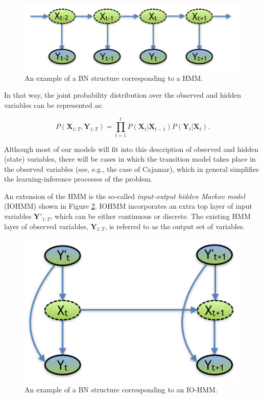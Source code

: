 \begin{figure}[ht!]
\begin{center}
\includegraphics[scale=0.4]{./figures/PreliminariesHMM}
\caption{\label{Figure:HMM}An example of a BN structure corresponding to a HMM.}
\end{center}
\end{figure}

In that way, the joint probability distribution over the observed and hidden variables can be represented as:

\begin{equation}
P(\bm X_{1:T},\bm Y_{1:T}) = \prod_{t=1}^t{P(\bm X_t| \bm X_{t-1})P(\bm Y_t|\bm X_t)}.
\end{equation}

Although most of our models will fit into this description of observed and hidden (state) variables, there will be cases in which the transition model takes place in the observed variables (see, e.g., the case of Cajamar), which in general simplifies the learning-inference processes of the problem.

An extension of the HMM is the so-called \textit{input-output hidden Markov model} (IOHMM) shown in Figure \ref{Figure:IO-HMM}. IOHMM incorporates an extra top layer of input variables $\bm Y'_{1:T}$, which can be either continuous or discrete. The existing HMM layer of observed variables, $\bm Y_{1:T}$, is referred to as the output set of variables. 

\begin{figure}[ht!]
\begin{center}
\includegraphics[scale=0.4]{./figures/PreliminariesIO-HMM}
\caption{\label{Figure:IO-HMM}An example of a BN structure corresponding to an IO-HMM.}
\end{center}
\end{figure}

